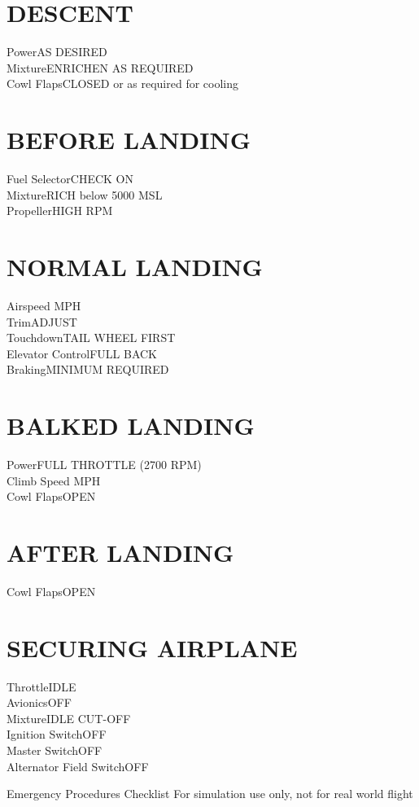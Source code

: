 \documentclass{article}
\begin{document}
\begin{multicols*}{2}
\section*{DESCENT}
Power\dotfill AS DESIRED\\
Mixture\dotfill ENRICHEN AS REQUIRED\\
Cowl Flaps\dotfill CLOSED or as required for cooling
\section*{BEFORE LANDING}
Fuel Selector\dotfill CHECK ON\\
Mixture\dotfill RICH below 5000 MSL\\
Propeller\dotfill HIGH RPM
\section*{NORMAL LANDING}
Airspeed MPH\\
Trim\dotfill ADJUST\\
Touchdown\dotfill TAIL WHEEL FIRST\\
Elevator Control\dotfill FULL BACK\\
Braking\dotfill MINIMUM REQUIRED
\section*{BALKED LANDING}
Power\dotfill FULL THROTTLE (2700 RPM)\\
Climb Speed MPH\\
Cowl Flaps\dotfill OPEN
\section*{AFTER LANDING}
Cowl Flaps\dotfill OPEN
\section*{SECURING AIRPLANE}
Throttle\dotfill IDLE\\
Avionics\dotfill OFF\\
Mixture\dotfill IDLE CUT-OFF\\
Ignition Switch\dotfill OFF\\
Master Switch\dotfill OFF\\
Alternator Field Switch\dotfill OFF\\
\end{multicols*}
\newpage
\begin{center}
    {\fontsize{20.74}{70}\selectfont Emergency Procedures Checklist}
    \break
    \color{Red}
    {\fontsize{10}{70}\selectfont For simulation use only, not for real world flight}
\end{center}
\end{document}
